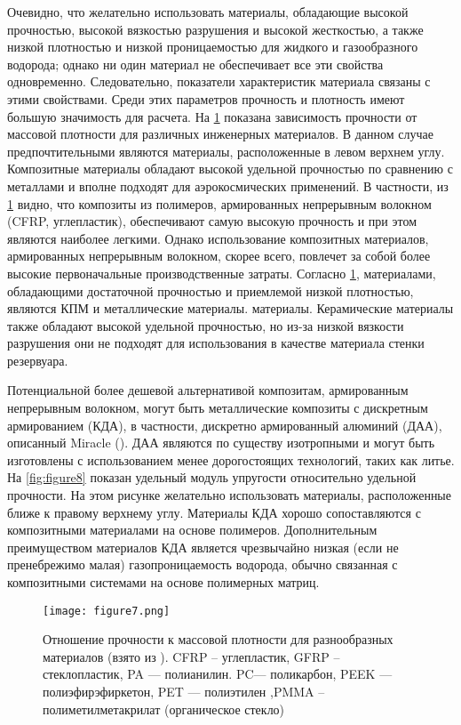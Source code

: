 Очевидно, что желательно использовать материалы, обладающие высокой прочностью, высокой вязкостью разрушения и высокой жесткостью, а также низкой плотностью и низкой проницаемостью для жидкого и газообразного водорода; однако ни один материал не обеспечивает все эти свойства одновременно.
Следовательно, показатели характеристик материала связаны с этими свойствами. Среди этих параметров прочность и плотность имеют большую значимость для расчета. На \cref{fig:figure7} показана зависимость прочности от массовой плотности для различных инженерных материалов. В данном случае предпочтительными являются материалы, расположенные в левом верхнем углу.
Композитные материалы обладают высокой удельной прочностью по сравнению с металлами и вполне подходят для аэрокосмических применений. В частности, из \cref{fig:figure7} видно, что композиты из полимеров, армированных непрерывным волокном (CFRP, углепластик), обеспечивают самую высокую прочность и при этом являются наиболее легкими. Однако использование композитных материалов, армированных непрерывным волокном, скорее всего, повлечет за собой более высокие первоначальные производственные затраты. Согласно \cref{fig:figure7}, материалами, обладающими достаточной прочностью и приемлемой низкой плотностью, являются КПМ и металлические материалы.
материалы. Керамические материалы также обладают высокой удельной прочностью, но из-за низкой вязкости разрушения они не подходят для использования в качестве материала стенки резервуара.

Потенциальной более дешевой альтернативой композитам, армированным непрерывным волокном, могут быть металлические композиты с дискретным армированием (КДА), в частности, дискретно армированный алюминий (ДАА), описанный Miracle (\cite{miracle2005}). ДАА являются по существу изотропными и могут быть изготовлены с использованием менее дорогостоящих технологий, таких как литье. На \cref{fig:figure8} показан удельный модуль упругости относительно удельной прочности. На этом рисунке желательно использовать материалы, расположенные ближе к правому верхнему углу. Материалы КДА хорошо сопоставляются с композитными материалами на основе полимеров. Дополнительным преимуществом материалов КДА является чрезвычайно низкая (если не пренебрежимо малая) газопроницаемость водорода, обычно связанная с композитными системами на основе полимерных матриц.


\begin{figure}[h!]
\centering
\texttt{[image: figure7.png]}%
\caption{Отношение прочности к массовой плотности для разнообразных материалов  (взято из \cite{ashby2005}). CFRP -- углепластик, GFRP -- стеклопластик, PA --- полианилин. PC--- поликарбон, PEEK --- полиэфирэфиркетон, PET --- полиэтилен ,PMMA -- полиметилметакрилат (органическое стекло)}
\label{fig:figure7}
\end{figure}

